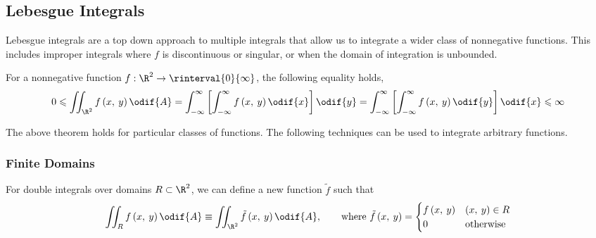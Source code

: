 \documentclass{article}
\begin{document}
\subsection{Lebesgue Integrals}
Lebesgue integrals are a top down approach to multiple integrals that
allow us to integrate a wider class of nonnegative functions. This
includes improper integrals where \(f\) is discontinuous or singular,
or when the domain of integration is unbounded.
\begin{theorem}
    For a nonnegative function \(f : \R^2 \to \rinterval{0}{\infty}\),
    the following equality holds,
    \begin{equation*}
        0 \leqslant \iint_{\R^2} f\left( x,\: y \right) \odif{A} = \int_{-\infty}^\infty \left[ \int_{-\infty}^\infty f\left( x,\: y \right) \odif{x} \right] \odif{y} = \int_{-\infty}^\infty \left[ \int_{-\infty}^\infty f\left( x,\: y \right) \odif{y} \right] \odif{x} \leqslant \infty
    \end{equation*}
\end{theorem}
The above theorem holds for particular classes of functions. The
following techniques can be used to integrate arbitrary functions.
\subsubsection{Finite Domains}
For double integrals over domains \(R \subset \R^2\), we can define a
new function \(\tilde{f}\) such that
\begin{equation*}
    \iint_R f\left( x,\: y \right) \odif{A} \equiv \iint_{\R^2} \tilde{f}\left( x,\: y \right) \odif{A}, \qquad \text{where } \tilde{f}\left( x,\: y \right) =
    \begin{cases}
        f\left( x,\: y \right) & \left( x,\: y \right) \in R \\
        0                      & \text{otherwise}
    \end{cases}
\end{equation*}
\end{document}
